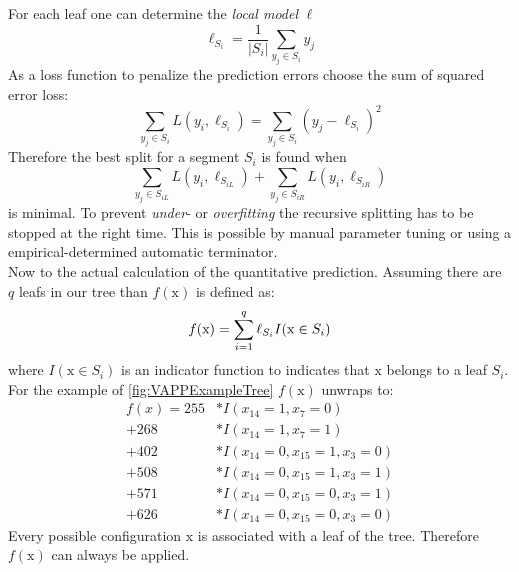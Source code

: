 For each leaf one can determine the \textit{local model} $\ell$
\begin{equation}
	\ell_{S_i} = \frac{1}{|S_i|} \sum_{y_j \in S_i} y_j
\end{equation}
As a loss function to penalize the prediction errors \citet{VariabilityAwarePerformancePredictionJianmeiSigmundApel} choose the sum of squared error loss:
\begin{equation}
	\sum_{y_j \in S_i} L(y_i,\ell_{S_i}) = \sum_{y_j \in S_i} (y_j - \ell_{S_i})^2
\end{equation}
Therefore the best split for a segment $S_i$ is found when
\begin{equation*}
\sum_{y_j \in S_{iL}} L(y_i,\ell_{S_{iL}}) + \sum_{y_j \in S_{iR}} L(y_i,\ell_{S_{iR}})
\end{equation*}
is minimal. To prevent \textit{under}- or \textit{overfitting}\cite{ElementsOfStatisticalLearning} the recursive splitting has to be stopped at the right time. This is possible by manual parameter tuning or using a empirical-determined automatic terminator. \\
Now to the actual calculation of the quantitative prediction. Assuming there are $q$ leafs in our tree than $f(\mathrm{x})$ is defined as:
\begin{equation}\textsl{}
f(\mathrm{x})=\sum_{i=1}^{q} \ell_{S_i}I(\mathrm{x}\in S_i)
\end{equation}
where $I(\mathrm{x}\in S_i)$ is an indicator function to indicates that $\mathrm{x}$ belongs to a leaf $S_i$.\\
For the example of \autoref{fig:VAPPExampleTree} $f(\mathrm{x})$ unwraps to:
\begin{align*}
f(x) = 255&* I(x_{14}=1,x_7=0)\\[-0.1cm]
	 + 268&* I(x_{14}=1,x_7=1)\\[-0.1cm]
	 + 402&* I(x_{14}=0,x_{15}=1,x_3=0)\\[-0.1cm]
	 + 508&* I(x_{14}=0,x_{15}=1,x_3=1)\\[-0.1cm]
	 + 571&* I(x_{14}=0,x_{15}=0,x_3=1)\\[-0.1cm]
	 + 626&* I(x_{14}=0,x_{15}=0,x_3=0)
\end{align*}
Every possible configuration $\mathrm{x}$ is associated with a leaf of the tree. Therefore $f(\mathrm{x})$ can always be applied.